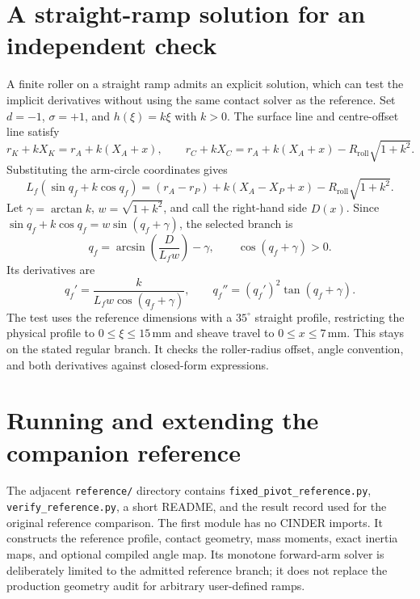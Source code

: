 \documentclass[11pt,letterpaper]{article}
\numberwithin{equation}{section}
\begin{document}
\section{A straight-ramp solution for an independent check}
\label{app:straight}

A finite roller on a straight ramp admits an explicit solution, which can test the implicit derivatives without using the same contact solver as the reference. Set $d=-1$, $\sigma=+1$, and $h(\xi)=k\xi$ with $k>0$. The surface line and centre-offset line satisfy
\begin{equation}
  r_K+kX_K=r_A+k(X_A+x),
  \qquad
  r_C+kX_C=r_A+k(X_A+x)-R_{\mathrm{roll}}\sqrt{1+k^2}.
\end{equation}
Substituting the arm-circle coordinates gives
\begin{equation}
  L_f(\sin q_f+k\cos q_f)
    =(r_A-r_P)+k(X_A-X_P+x)-R_{\mathrm{roll}}\sqrt{1+k^2}.
\end{equation}
Let $\gamma=\arctan k$, $w=\sqrt{1+k^2}$, and call the right-hand side $D(x)$. Since $\sin q_f+k\cos q_f=w\sin(q_f+\gamma)$, the selected branch is
\begin{equation}
  q_f=\arcsin\!\left(\frac{D}{L_fw}\right)-\gamma,
  \qquad \cos(q_f+\gamma)>0.
\end{equation}
Its derivatives are
\begin{equation}
  q_f'=\frac{k}{L_fw\cos(q_f+\gamma)},
  \qquad q_f''=(q_f')^2\tan(q_f+\gamma).
\end{equation}
The test uses the reference dimensions with a $35^\circ$ straight profile, restricting the physical profile to $0\le\xi\le15\,\mathrm{mm}$ and sheave travel to $0\le x\le7\,\mathrm{mm}$. This stays on the stated regular branch. It checks the roller-radius offset, angle convention, and both derivatives against closed-form expressions.

\clearpage
\section{Running and extending the companion reference}
\label{app:running}

The adjacent \texttt{reference/} directory contains \texttt{fixed\_pivot\_reference.py}, \texttt{verify\_reference.py}, a short README, and the result record used for the original reference comparison. The first module has no CINDER imports. It constructs the reference profile, contact geometry, mass moments, exact inertia maps, and optional compiled angle map. Its monotone forward-arm solver is deliberately limited to the admitted reference branch; it does not replace the production geometry audit for arbitrary user-defined ramps.
\end{document}
